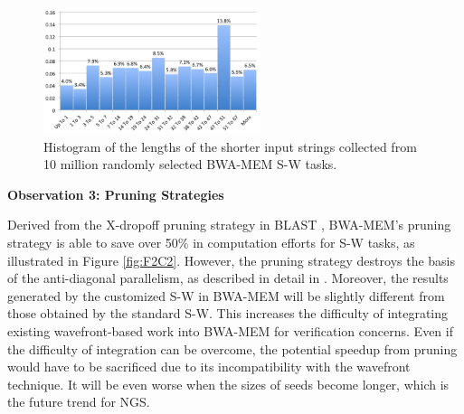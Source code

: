 \begin{figure}[!hbt]
	\begin{center}
		\includegraphics[width=2.5in]{Figures/Figure4C2.jpg}
		\caption {Histogram of the lengths of the shorter input strings collected from 10 million randomly selected BWA-MEM S-W tasks.}
		\label{fig:F4C2}
	\end{center}
\end{figure}
\vspace{-10pt}


\vspace{1pt}
\textbf{Observation 3: Pruning Strategies}
\vspace{1pt}

Derived from the X-dropoff pruning strategy in BLAST \cite{BLAST1990}, 
BWA-MEM's pruning strategy is able to save over 50\% in computation efforts for S-W tasks, as illustrated in Figure \ref{fig:F2C2}. 
However, the pruning strategy destroys the basis of the anti-diagonal parallelism, as described in detail in \cite{BWA-MEM}. 
Moreover, the results generated by the customized S-W in BWA-MEM will be slightly different from those obtained by the standard S-W. 
This increases the difficulty of integrating existing wavefront-based work into BWA-MEM for verification concerns. 
Even if the difficulty of integration can be overcome, 
the potential speedup from pruning would have to be sacrificed due to its incompatibility with the wavefront technique.
It will be even worse when the sizes of seeds become longer, which is the future trend for NGS.

